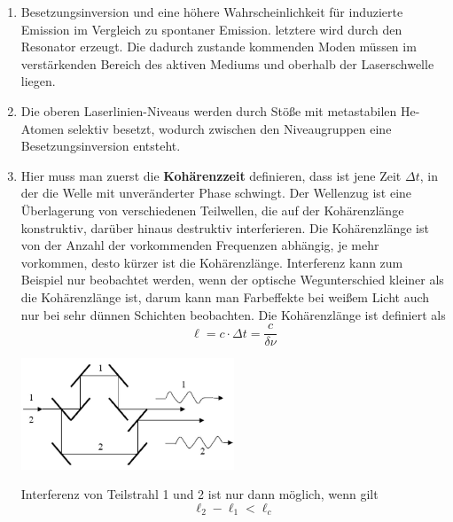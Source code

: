 \documentclass[12pt,a4paper,ngerman]{article}
\begin{document}
\begin{enumerate}
\item Besetzungsinversion und eine höhere Wahrscheinlichkeit für induzierte Emission im Vergleich zu spontaner Emission. letztere wird durch den Resonator erzeugt. Die dadurch zustande kommenden Moden müssen im verstärkenden Bereich des aktiven Mediums und oberhalb der Laserschwelle liegen.
\item Die oberen Laserlinien-Niveaus werden durch Stöße mit metastabilen He-Atomen selektiv besetzt, wodurch zwischen den Niveaugruppen eine Besetzungsinversion entsteht. 
\item Hier muss man zuerst die \textbf{Kohärenzzeit} definieren, dass ist jene Zeit $\Delta t$, in der die Welle mit unveränderter Phase schwingt. 
Der Wellenzug ist eine Überlagerung von verschiedenen Teilwellen, die auf der Kohärenzlänge konstruktiv, darüber hinaus destruktiv interferieren. Die Kohärenzlänge ist von der Anzahl der vorkommenden Frequenzen abhängig, je mehr vorkommen, desto kürzer ist die Kohärenzlänge. Interferenz kann zum Beispiel nur beobachtet werden, wenn der optische Wegunterschied kleiner als die Kohärenzlänge ist, darum kann man Farbeffekte bei weißem Licht auch nur bei sehr dünnen Schichten beobachten. 
Die Kohärenzlänge ist definiert als
\begin{equation*}
 \ell = c \cdot \Delta t = \frac{c}{\delta \nu}
 \end{equation*} 
 
\begin{center}
 \includegraphics[width = 0.5\textwidth]{interferometer.png} 
\end{center}
 
 Interferenz von Teilstrahl 1 und 2 ist nur dann möglich, wenn gilt \begin{equation*}
 \ell_2 - \ell_1 < \ell_c
 \end{equation*}
\end{enumerate}
\end{document}
